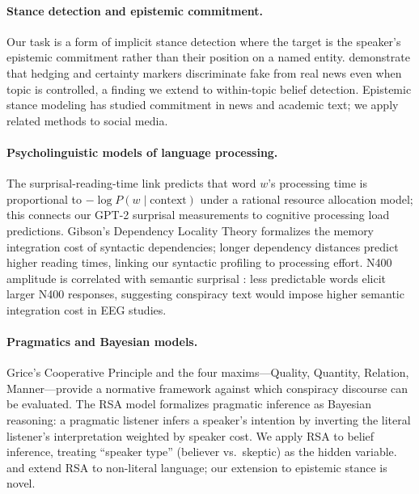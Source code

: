 \documentclass[11pt]{article}
\begin{document}
\paragraph{Stance detection and epistemic commitment.}
Our task is a form of implicit stance detection
\citep{mohammad2016semeval,aldayel2021stance} where the target is the
speaker's epistemic commitment rather than their position on a named
entity.
\citet{rashkin2017truth} demonstrate that hedging and certainty
markers discriminate fake from real news even when topic is controlled,
a finding we extend to within-topic belief detection.
Epistemic stance modeling \citep{diab2009committed,de2012detecting}
has studied commitment in news and academic text; we apply related
methods to social media.

\paragraph{Psycholinguistic models of language processing.}
The surprisal-reading-time link \citep{levy2008expectation} predicts
that word $w$'s processing time is proportional to
$-\log P(w \mid \text{context})$ under a rational resource allocation
model; this connects our GPT-2 surprisal measurements to cognitive
processing load predictions.
Gibson's Dependency Locality Theory \citep{gibson1998linguistic}
formalizes the memory integration cost of syntactic dependencies;
longer dependency distances predict higher reading times, linking our
syntactic profiling to processing effort.
N400 amplitude is correlated with semantic surprisal
\citep{kutas1980reading,frank2015erp}: less predictable words elicit
larger N400 responses, suggesting conspiracy text would impose higher
semantic integration cost in EEG studies.

\paragraph{Pragmatics and Bayesian models.}
Grice's Cooperative Principle \citep{grice1975logic} and the four
maxims---Quality, Quantity, Relation, Manner---provide a normative
framework against which conspiracy discourse can be evaluated.
The RSA model \citep{goodman2016pragmatics,frank2012predicting}
formalizes pragmatic inference as Bayesian reasoning: a pragmatic
listener infers a speaker's intention by inverting the literal
listener's interpretation weighted by speaker cost.
We apply RSA to belief inference, treating ``speaker type'' (believer
vs.\ skeptic) as the hidden variable.
\citet{bergen2016pragmatic} and \citet{kao2014nonliteral} extend RSA
to non-literal language; our extension to epistemic stance is novel.
\end{document}
